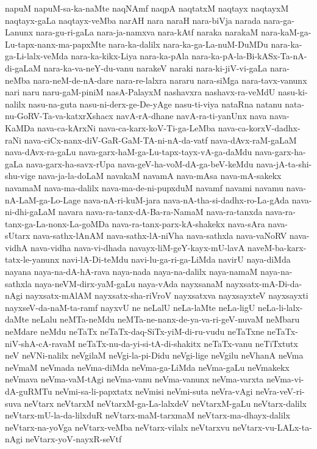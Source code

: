 {napuM
napuM-sa-ka-naMte
naqNAmf
naqpA
naqtatxM
naqtayx
naqtayxM
naqtayx-gaLa
naqtayx-veMba
narAH
nara
naraH
nara-biVja
narada
nara-ga-Lanunx
nara-gu-ri-gaLa
nara-ja-namxva
nara-kAtf
naraka
narakaM
nara-kaM-ga-Lu-tapx-nanx-ma-papxMte
nara-ka-dalilx
nara-ka-ga-La-nuM-DuMDu
nara-ka-ga-Li-lalx-veMda
nara-ka-kikx-Liya
nara-ka-pAla
nara-ka-pA-la-Bi-kASx-Ta-nA-di-gaLaM
nara-ka-va-neY-du-vanu
narakeV
naraki
nara-ki-jiV-vi-gaLa
nara-neMba
nara-neM-de-nA-dare
nara-re-lalxra
nararu
nara-siMga
nara-tavx-vanunx
nari
naru
naru-gaM-piniM
nasA-PalayxM
nashavxra
nashavx-ra-veMdU
nasu-ki-nalilx
nasu-na-guta
nasu-ni-derx-ge-De-yAge
nasu-ti-viya
nataRna
natanu
nata-nu-GoRV-Ta-va-katxrXshacx
navA-rA-dhane
navA-ra-ti-yanUnx
nava
nava-KaMDa
nava-ca-kArxNi
nava-ca-karx-koV-Ti-ga-LeMba
nava-ca-korxV-dadhx-raNi
nava-ciCx-nanx-diV-GaR-GaM-TA-ni-nA-da-vatf
nava-dAvx-raM-gaLaM
nava-dAvx-ra-gaLu
nava-garx-haM-ga-Lu-tapx-tayx-vA-ga-daMdu
nava-garx-ha-gaLa
nava-garx-ha-savx-rUpa
nava-geV-ha-voM-dA-ga-beV-keMdu
nava-jA-ta-shi-shu-vige
nava-ja-la-doLaM
navakaM
navamA
nava-mAsa
nava-mA-sakekx
navamaM
nava-ma-dalilx
nava-ma-de-ni-pupxduM
navamf
navami
navamu
nava-nA-LaM-ga-Lo-Lage
nava-nA-ri-kuM-jara
nava-nA-tha-si-dadhx-ro-La-gAda
nava-ni-dhi-gaLaM
navara
nava-ra-tanx-dA-Ba-ra-NamaM
nava-ra-tanxda
nava-ra-tanx-ga-La-nonx-La-goMDa
nava-ra-tanx-parx-kA-shakekx
nava-sAra
nava-sUtarx
nava-sathx-lAnAM
nava-sathx-lA-niVha
nava-sathxla
nava-vaNoRV
nava-vidhA
nava-vidha
nava-vi-dhada
navayx-liM-geY-kayx-mU-lavA
naveM-ba-karx-tatx-le-yanunx
navi-lA-Di-teMdu
navi-lu-ga-ri-ga-LiMda
navirU
naya-diMda
nayana
naya-na-dA-hA-rava
naya-nada
naya-na-dalilx
naya-namaM
naya-na-sathxla
naya-neVM-dirx-yaM-gaLu
naya-vAda
nayxsanaM
nayxsatx-mA-Di-da-nAgi
nayxsatx-mAlAM
nayxsatx-sha-riVroV
nayxsatxva
nayxsayxteV
nayxsayxti
nayxseV-da-naM-ta-ramf
nayxvU
ne
neLalU
neLa-laMte
neLa-ligU
neLa-li-lalx-daMte
neLalu
neMTa-neMdu
neMTa-ne-nanx-de-ya-va-ri-geV-nuvaM
neMbaru
neMdare
neMdu
neTaTx
neTaTx-daq-SiTx-yiM-di-ru-vudu
neTaTxne
neTaTx-niV-shA-cA-ravaM
neTaTx-nu-da-yi-si-tA-di-shakitx
neTaTx-vanu
neTiTxtutx
neV
neVNi-nalilx
neVgilaM
neVgi-la-pi-Didu
neVgi-lige
neVgilu
neVhanA
neVma
neVmaM
neVmada
neVma-diMda
neVma-ga-LiMda
neVma-gaLu
neVmakekx
neVmava
neVma-vaM-tAgi
neVma-vanu
neVma-vanunx
neVma-varxta
neVma-vi-dA-guRMTu
neVmi-sa-li-papxtatx
neVmisi
neVmi-suta
neVra-vAgi
neVra-veV-ri-suva
neVtarx
neVtarxM
neVtarxM-ga-La-lalxdeV
neVtarxM-gaLu
neVtarx-dalilx
neVtarx-mU-la-da-lilxduR
neVtarx-maM-tarxmaM
neVtarx-ma-dhayx-dalilx
neVtarx-na-yoVga
neVtarx-veMba
neVtarx-vilalx
neVtarxvu
neVtarx-vu-LALx-ta-nAgi
neVtarx-yoV-nayxR-seVtf
}
